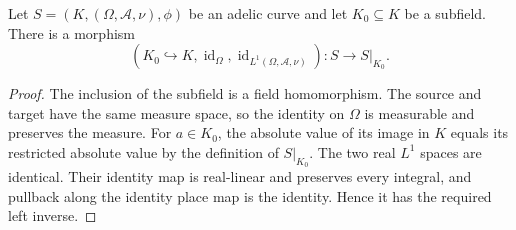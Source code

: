 \begin{example}
\label{ex:subfield-restriction-morphism}
\leanok
{}
Let $S=(K,(\Omega,\mathcal A,\nu),\phi)$ be an adelic curve and
let $K_0\subseteq K$ be a subfield. There is a morphism
\[
 (K_0\hookrightarrow K,\operatorname{id}_\Omega,
       \operatorname{id}_{L^1(\Omega,\mathcal A,\nu)})
 :S\longrightarrow S|_{K_0}.
\]
\end{example}
\begin{proof}
The inclusion of the subfield is a field homomorphism. The source and
target have the same measure space, so the identity on $\Omega$ is
measurable and preserves the measure. For $a\in K_0$, the absolute value
of its image in $K$ equals its restricted absolute value by the definition
of $S|_{K_0}$. The two real $L^1$ spaces are identical. Their identity
map is real-linear and preserves every integral, and pullback along the
identity place map is the identity. Hence it has the required left inverse.
\end{proof}

